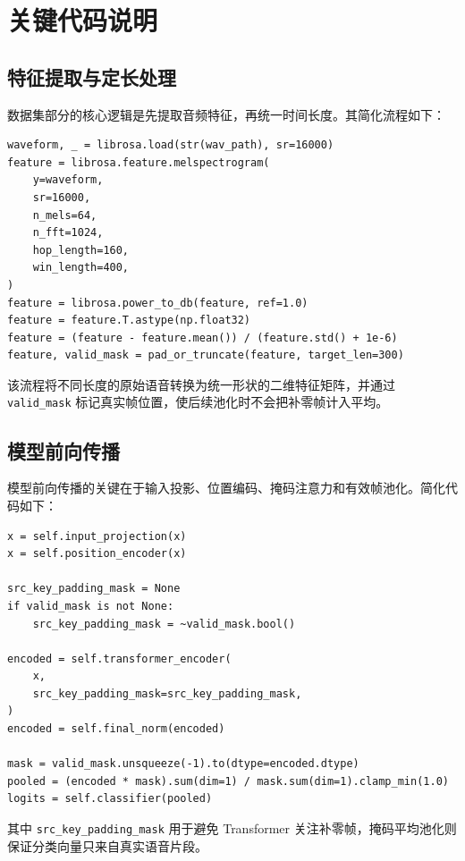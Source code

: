 \documentclass[UTF8,12pt,a4paper]{ctexart}
\begin{document}
\section{关键代码说明}

\subsection{特征提取与定长处理}
数据集部分的核心逻辑是先提取音频特征，再统一时间长度。其简化流程如下：

\begin{lstlisting}[caption={语音特征提取与定长处理流程}]
waveform, _ = librosa.load(str(wav_path), sr=16000)
feature = librosa.feature.melspectrogram(
    y=waveform,
    sr=16000,
    n_mels=64,
    n_fft=1024,
    hop_length=160,
    win_length=400,
)
feature = librosa.power_to_db(feature, ref=1.0)
feature = feature.T.astype(np.float32)
feature = (feature - feature.mean()) / (feature.std() + 1e-6)
feature, valid_mask = pad_or_truncate(feature, target_len=300)
\end{lstlisting}

该流程将不同长度的原始语音转换为统一形状的二维特征矩阵，并通过 \texttt{valid\_mask} 标记真实帧位置，使后续池化时不会把补零帧计入平均。

\subsection{模型前向传播}
模型前向传播的关键在于输入投影、位置编码、掩码注意力和有效帧池化。简化代码如下：

\begin{lstlisting}[caption={Transformer 情感分类器前向传播}]
x = self.input_projection(x)
x = self.position_encoder(x)

src_key_padding_mask = None
if valid_mask is not None:
    src_key_padding_mask = ~valid_mask.bool()

encoded = self.transformer_encoder(
    x,
    src_key_padding_mask=src_key_padding_mask,
)
encoded = self.final_norm(encoded)

mask = valid_mask.unsqueeze(-1).to(dtype=encoded.dtype)
pooled = (encoded * mask).sum(dim=1) / mask.sum(dim=1).clamp_min(1.0)
logits = self.classifier(pooled)
\end{lstlisting}

其中 \texttt{src\_key\_padding\_mask} 用于避免 Transformer 关注补零帧，掩码平均池化则保证分类向量只来自真实语音片段。
\end{document}
